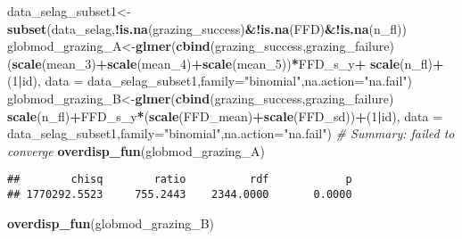 \documentclass[
]{article}
\newenvironment{Shaded}{\begin{snugshade}}{\end{snugshade}}
\newcommand{\CommentTok}[1]{\textcolor[rgb]{0.56,0.35,0.01}{\textit{#1}}}
\newcommand{\DataTypeTok}[1]{\textcolor[rgb]{0.13,0.29,0.53}{#1}}
\newcommand{\DecValTok}[1]{\textcolor[rgb]{0.00,0.00,0.81}{#1}}
\newcommand{\KeywordTok}[1]{\textcolor[rgb]{0.13,0.29,0.53}{\textbf{#1}}}
\newcommand{\NormalTok}[1]{#1}
\newcommand{\OperatorTok}[1]{\textcolor[rgb]{0.81,0.36,0.00}{\textbf{#1}}}
\newcommand{\StringTok}[1]{\textcolor[rgb]{0.31,0.60,0.02}{#1}}
\begin{document}
\begin{Shaded}
\begin{Highlighting}[]
\NormalTok{data_selag_subset1<-}\KeywordTok{subset}\NormalTok{(data_selag,}\OperatorTok{!}\KeywordTok{is.na}\NormalTok{(grazing_success)}\OperatorTok{&!}\KeywordTok{is.na}\NormalTok{(FFD)}\OperatorTok{&!}\KeywordTok{is.na}\NormalTok{(n_fl))}
\NormalTok{globmod_grazing_A<-}\KeywordTok{glmer}\NormalTok{(}\KeywordTok{cbind}\NormalTok{(grazing_success,grazing_failure)}\OperatorTok{~}
\StringTok{                           }\NormalTok{(}\KeywordTok{scale}\NormalTok{(mean_}\DecValTok{3}\NormalTok{)}\OperatorTok{+}\KeywordTok{scale}\NormalTok{(mean_}\DecValTok{4}\NormalTok{)}\OperatorTok{+}\KeywordTok{scale}\NormalTok{(mean_}\DecValTok{5}\NormalTok{))}\OperatorTok{*}\NormalTok{FFD_s_y}\OperatorTok{+}
\StringTok{                           }\KeywordTok{scale}\NormalTok{(n_fl)}\OperatorTok{+}\NormalTok{(}\DecValTok{1}\OperatorTok{|}\NormalTok{id),}
                         \DataTypeTok{data =}\NormalTok{ data_selag_subset1,}\DataTypeTok{family=}\StringTok{"binomial"}\NormalTok{,}\DataTypeTok{na.action=}\StringTok{"na.fail"}\NormalTok{)}
\NormalTok{globmod_grazing_B<-}\KeywordTok{glmer}\NormalTok{(}\KeywordTok{cbind}\NormalTok{(grazing_success,grazing_failure)}\OperatorTok{~}
\StringTok{                           }\KeywordTok{scale}\NormalTok{(n_fl)}\OperatorTok{+}\NormalTok{FFD_s_y}\OperatorTok{*}\NormalTok{(}\KeywordTok{scale}\NormalTok{(FFD_mean)}\OperatorTok{+}\KeywordTok{scale}\NormalTok{(FFD_sd))}\OperatorTok{+}\NormalTok{(}\DecValTok{1}\OperatorTok{|}\NormalTok{id),}
                         \DataTypeTok{data =}\NormalTok{ data_selag_subset1,}\DataTypeTok{family=}\StringTok{"binomial"}\NormalTok{,}\DataTypeTok{na.action=}\StringTok{"na.fail"}\NormalTok{)}
\CommentTok{# Summary: failed to converge}
\KeywordTok{overdisp_fun}\NormalTok{(globmod_grazing_A)}
\end{Highlighting}
\end{Shaded}

\begin{verbatim}
##        chisq        ratio          rdf            p 
## 1770292.5523     755.2443    2344.0000       0.0000
\end{verbatim}

\begin{Shaded}
\begin{Highlighting}[]
\KeywordTok{overdisp_fun}\NormalTok{(globmod_grazing_B)}
\end{Highlighting}
\end{Shaded}
\end{document}
